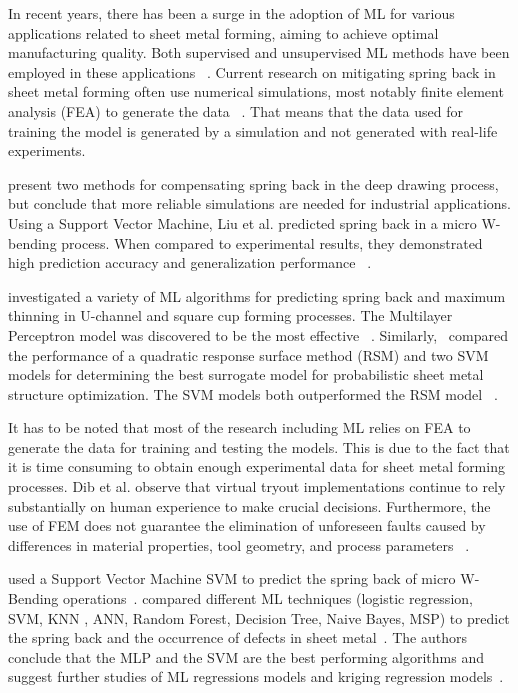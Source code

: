 In recent years, there has been a surge in the adoption of \ac{ML} for various applications related to sheet metal
forming, aiming to achieve optimal manufacturing quality.
Both supervised and unsupervised \ac{ML} methods have been employed in these applications
~\cite[p. 2]{cruz2021application}.
Current research on mitigating spring back in sheet metal forming often use numerical simulations, most notably
finite element analysis (FEA) to generate the data
~\cite[p. 566]{liu2021deep}.
That means that the data used for training the model is generated by a simulation and not generated with real-life
experiments.

\cite{lingbeek2005development} present two methods for compensating spring back in the deep
drawing process, but conclude that more reliable simulations are needed for industrial applications.
Using a Support Vector Machine, Liu et al. predicted spring back in a micro W-bending process.
When compared to experimental results, they demonstrated high prediction accuracy and generalization performance
~\cite[p. 1]{liu2019springback}.

\cite{dib2020single} investigated a variety of \ac{ML} algorithms for predicting spring back and
maximum thinning in
U-channel and square cup forming processes.
The Multilayer Perceptron model was discovered to be the most effective
~\cite[]{dib2020single}.
Similarly,~\cite{abdessalem2015probabilistic} compared the performance of a quadratic response surface method (RSM)
and two \ac{SVM} models for determining the best surrogate model for probabilistic sheet metal structure optimization.
The \ac{SVM} models both outperformed the RSM model
~\cite[]{abdessalem2015probabilistic}.

It has to be noted that most of the research including \ac{ML} relies on FEA to generate the data for training and
testing the models.
This is due to the fact that it is time consuming to obtain enough experimental data for
sheet metal forming processes.
Dib et al. observe that virtual tryout implementations continue to rely substantially on human experience to make
crucial decisions.
Furthermore, the use of FEM does not guarantee the elimination of unforeseen faults caused by differences in material
properties, tool geometry, and process parameters
~\cite[p. 2]{dib2020single}.

\cite{liu2019springback} used a Support Vector Machine \ac{SVM} to predict the spring back of
micro W-Bending operations~\cite[]{liu2019springback}.
\cite{dib2020single} compared different \ac{ML} techniques (logistic regression, SVM, KNN
, ANN, Random Forest, Decision Tree, Naive Bayes, MSP) to predict the spring back and the occurrence of
defects in sheet metal~\cite[p. 1]{dib2020single}.
The authors conclude that the MLP and the SVM are the best performing algorithms and
suggest further studies of ML regressions models and kriging regression
models~\cite[p. 13]{dib2020single}.

